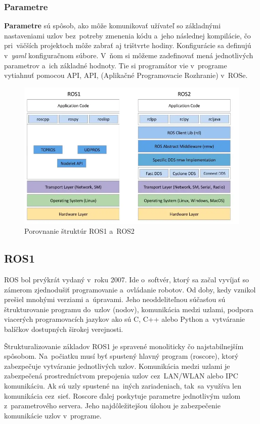 \subsubsection{Parametre}
\label{sec:parametre}

\textbf{Parametre} sú spôsob, ako môže komunikovať užívateľ so základnými nastaveniami uzlov bez~potreby zmenenia kódu a~jeho
následnej kompilácie, čo pri~väčších projektoch môže zabrať aj trištvrte hodiny. Konfigurácie sa definujú v~\textit{yaml} konfiguračnom
súbore. V~ňom si môžeme zadefinovať mená jednotlivých parametrov a~ich základné hodnoty. Tie si programátor vie v~programe
vytiahnuť pomocou API, \acrlong{API}, (Aplikačné Programovacie Rozhranie) v~ROSe.

\begin{figure}[!htbp]
	\centering
	\includegraphics[width=15cm]{img/strukturaRos1Ros2.png}
	\caption{Porovnanie štruktúr ROS1 a~ROS2~\cite{comparison}}
	\label{fig:struktury}
\end{figure}

\subsection{ROS1}

ROS bol prvýkrát vydaný v~roku 2007. Ide o~softvér, ktorý sa začal vyvíjať so zámerom zjednodušiť programovanie a~ovládanie robotov.
Od doby, kedy vznikol prešiel mnohými verziami a~úpravami. Jeho neoddeliteľnou súčasťou sú štrukturovanie programu do~uzlov (nodov),
komunikácia medzi uzlami, podpora viacerých programovacích jazykov ako sú C, C++ alebo Python a~vytváranie balíčkov dostupných širokej
verejnosti.

Štrukturalizovanie základov ROS1 je spravené monoliticky čo najstabilnejším spôsobom. Na~počiatku musí byť spustený hlavný program (roscore),
ktorý zabezpečuje vytváranie jednotlivých uzlov. Komunikácia medzi uzlami je zabezpečená prostredníctvom prepojenia uzlov cez~LAN/WLAN
alebo IPC komunikáciu. Ak sú uzly spustené na~iných zariadeniach, tak~sa využíva len komunikácia cez~sieť. Roscore ďalej poskytuje parametre
jednotlivým uzlom z~parametrového servera. Jeho najdôležitejšou úlohou je zabezpečenie komunikácie uzlov v~programe.

